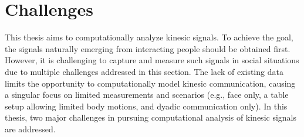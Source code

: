 %
%

\section{Challenges}
This thesis aims to computationally analyze kinesic signals. To achieve the goal, the signals naturally emerging from interacting people should be obtained first. However, it is challenging to capture and measure such signals in social situations due to multiple challenges addressed in this section. The lack of existing data limits the opportunity to computationally model kinesic communication, causing a singular focus on limited measurements and scenarios (e.g., face only, a table setup allowing limited body motions, and dyadic communication only). In this thesis, two major challenges in pursuing computational analysis of kinesic signals are addressed.\\ %

